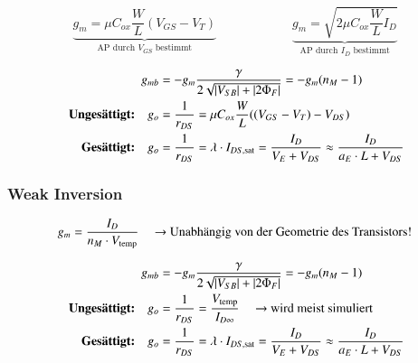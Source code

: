 \[
    \underbrace{ g_m = \mu C_{ox} \frac{W}{L} (V_{GS} - V_T) }_{\text{AP durch } V_{GS} \text{ bestimmt}} \qquad \qquad \qquad
    \underbrace{ g_m = \sqrt{2 \mu C_{ox} \frac{W}{L} I_D} }_{\text{AP durch } I_D \text{ bestimmt}} 
\]


\vspace{-0.15cm}

\begin{align*}
                                         g_{mb} &= -g_m \frac{\gamma}{2 \sqrt{\left|V_{SB}\right| + \left|2 \Phi_F\right|}} = - g_m (n_M - 1)                                     \\
    \text{ \textbf{Ungesättigt:}} \quad     g_o &= \frac{1}{r_{DS}} = \mu C_{ox} \frac{W}{L} ((V_{GS} - V_T) - V_{DS})                                              \\
    \text{ \textbf{Gesättigt:}} \quad       g_o &=  \frac{1}{r_{DS}} = \lambda \cdot I_{DS, \rm sat} = \frac{I_D}{V_E + V_{DS}} \approx \frac{I_D}{a_E \cdot L + V_{DS}}
\end{align*}


\subsubsection{Weak Inversion}

\vspace{-0.3cm}

\[
    g_m = \frac{I_D}{n_M \cdot V_\text{temp}} \quad \text{ \textrightarrow\ Unabhängig von der Geometrie des Transistors!}
\]


\vspace{-0.15cm}

\begin{align*}
                                         g_{mb} &= -g_m \frac{\gamma}{2 \sqrt{\abs{V_{SB}} + \abs{2 \Phi_F}}} = - g_m (n_M - 1)                                             \\
    \text{ \textbf{Ungesättigt:}} \quad     g_o &= \frac{1}{r_{DS}} = \frac{V_{\text{temp}}}{I_{D \infty}} \quad \text{ \textrightarrow\ wird meist simuliert}              \\
    \text{ \textbf{Gesättigt:}} \quad       g_o &=  \frac{1}{r_{DS}} = \lambda \cdot  I_{DS, \rm sat} = \frac{I_D}{V_E + V_{DS}}  \approx \frac{I_D}{a_E \cdot L + V_{DS}}
\end{align*}


